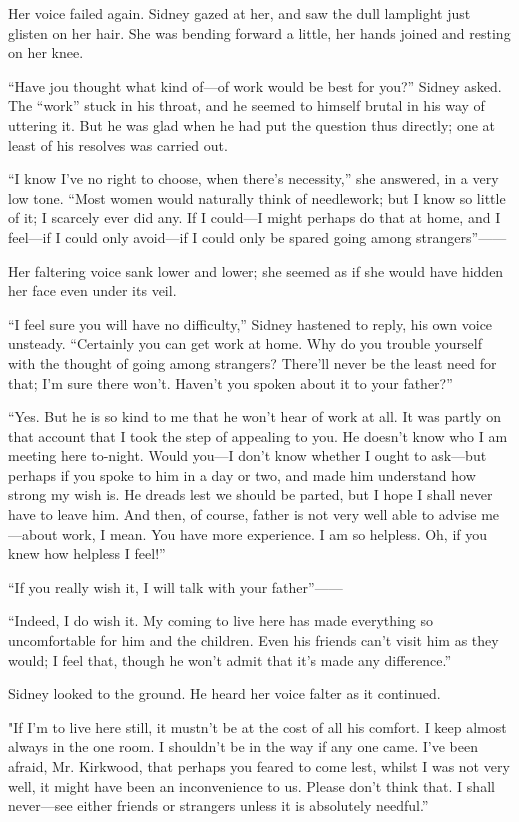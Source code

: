 Her voice failed again. Sidney gazed at her, and saw the dull lamplight
just glisten on her hair. She was bending forward a little, her hands
joined and resting on her knee.

{}``Have jou thought what kind of---of work would be best for you?''
Sidney asked. The ``work'' stuck in his throat, and he seemed to himself
brutal in his way of uttering it. But he was glad when he had put the
question thus directly; one at least of his resolves was carried out.

``I know I've no right to choose, when there's necessity,'' she
answered, in a very low tone. ``Most women would naturally think of
needlework; but I know so little of it; I scarcely ever did any. If I
could---I might perhaps do that at home, and I feel---if I could only
avoid---if I could only be spared going among strangers''{{------}}

Her faltering voice sank lower and lower; she seemed as if she would
have hidden her face even under its veil.

``I feel sure you will have no difficulty,'' Sidney hastened to reply,
his own voice unsteady. ``Certainly you can get work at home. Why do you
trouble yourself with the thought of going among strangers? There'll
never be the least need for that; I'm sure there won't. Haven't you
spoken about it to your father?''

{}``Yes. But he is so kind to me that he won't hear of work at all. It
was partly on that account that I took the step of appealing to you. He
doesn't know who I am meeting here to-night. Would you---I don't know
whether I ought to ask---but perhaps if you spoke to him in a day or
two, and made him understand how strong my wish is. He dreads lest we
should be parted, but I hope I shall never have to leave him. And then,
of course, father is not very well able to advise me---about work, I
mean. You have more experience. I am so helpless. Oh, if you knew how
helpless I feel!''

``If you really wish it, I will talk with your father''{{------}}

``Indeed, I do wish it. My coming to live here has made everything so
uncomfortable for him and the children. Even his friends can't visit him
as they would; I feel that, though he won't admit that it's made any
difference.''

Sidney looked to the ground. He heard her voice falter as it continued.

"If I'm to live here still, it mustn't be at the cost of all his
comfort. I keep almost {}always in the one room. I shouldn't be in the
way if any one came. I've been afraid, Mr. Kirkwood, that perhaps you
feared to come lest, whilst I was not very well, it might have been an
inconvenience to us. Please don't think that. I shall never---see either
friends or strangers unless it is absolutely needful.''

